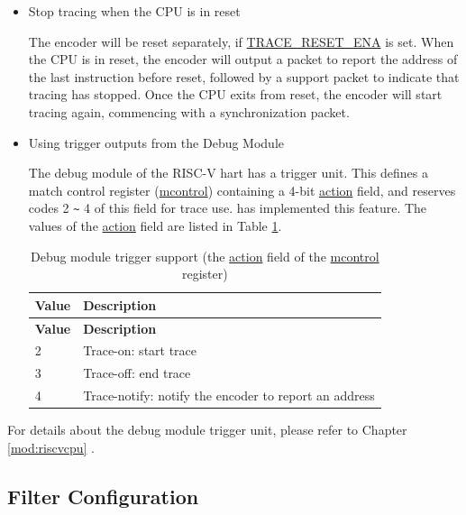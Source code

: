 \documentclass[main\_\_EN.tex]{subfiles}
\begin{document}
\begin{itemize}
        \item Stop tracing when the CPU is in reset

            The encoder will be reset separately, if \hyperref[fielddesc:TRACERESETENA]{TRACE\_RESET\_ENA} is set. When the CPU is in reset, the encoder will output a packet to report the address of the last instruction before reset, followed by a support packet to indicate that tracing has stopped. Once the CPU exits from reset, the encoder will start tracing again, commencing with a synchronization packet.

        \item Using trigger outputs from the Debug Module

            The debug module of the RISC-V hart has a trigger unit. This defines a match control register (\hyperref[regdesc:MCONTROL]{mcontrol}) containing a 4-bit \hyperref[fielddesc:MCONTROLACTION]{action} field, and reserves codes 2 \verb+~+ 4 of this field for trace use. \chipname{} has implemented this feature. The values of the \hyperref[fielddesc:MCONTROLACTION]{action} field are listed in Table \ref{tab:debug_mcontrol}.

            \begin{longtable}[c]{ |l|l| }
    \caption{Debug module trigger support (the \hyperref[fielddesc:MCONTROLACTION]{action} field of the \hyperref[regdesc:MCONTROL]{mcontrol} register)}
    \label{tab:debug_mcontrol}
    \\\hline\rowcolor{lightgray}
    \textbf{Value} & \textbf{Description} \\\hline
    \endfirsthead
    \textbf{Value} & \textbf{Description} \\\hline
    \endhead
    \endfoot
    \endlastfoot

    2 & Trace-on: start trace \\\hline
    3 & Trace-off: end trace \\\hline
    4 & Trace-notify: notify the encoder to report an address \\\hline

    \end{longtable}
\end{itemize}

For details about the debug module trigger unit, please refer to Chapter \ref{mod:riscvcpu} \textit{}.


\subsection{Filter Configuration}
\end{document}

